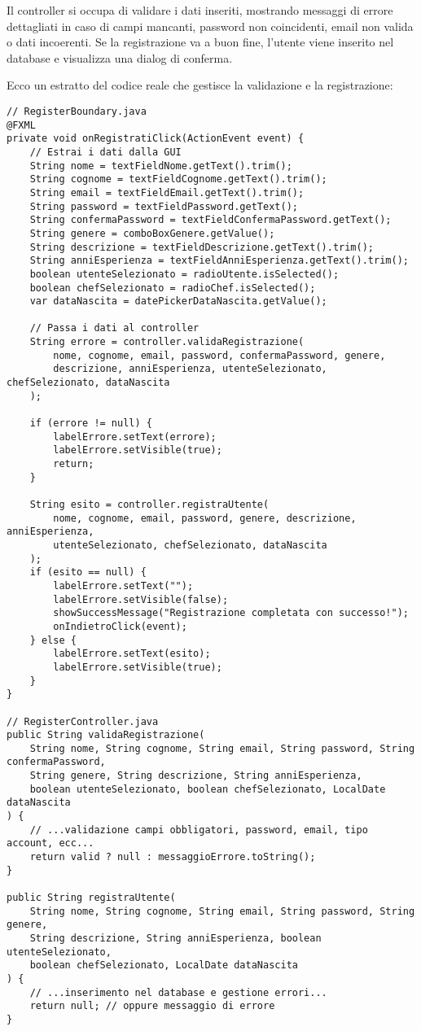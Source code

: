 Il controller si occupa di validare i dati inseriti, mostrando messaggi di errore dettagliati in caso di campi mancanti, password non coincidenti, email non valida o dati incoerenti. Se la registrazione va a buon fine, l’utente viene inserito nel database e visualizza una dialog di conferma.

Ecco un estratto del codice reale che gestisce la validazione e la registrazione:
\begin{verbatim}
// RegisterBoundary.java
@FXML
private void onRegistratiClick(ActionEvent event) {
    // Estrai i dati dalla GUI
    String nome = textFieldNome.getText().trim();
    String cognome = textFieldCognome.getText().trim();
    String email = textFieldEmail.getText().trim();
    String password = textFieldPassword.getText();
    String confermaPassword = textFieldConfermaPassword.getText();
    String genere = comboBoxGenere.getValue();
    String descrizione = textFieldDescrizione.getText().trim();
    String anniEsperienza = textFieldAnniEsperienza.getText().trim();
    boolean utenteSelezionato = radioUtente.isSelected();
    boolean chefSelezionato = radioChef.isSelected();
    var dataNascita = datePickerDataNascita.getValue();

    // Passa i dati al controller
    String errore = controller.validaRegistrazione(
        nome, cognome, email, password, confermaPassword, genere,
        descrizione, anniEsperienza, utenteSelezionato, chefSelezionato, dataNascita
    );

    if (errore != null) {
        labelErrore.setText(errore);
        labelErrore.setVisible(true);
        return;
    }

    String esito = controller.registraUtente(
        nome, cognome, email, password, genere, descrizione, anniEsperienza,
        utenteSelezionato, chefSelezionato, dataNascita
    );
    if (esito == null) {
        labelErrore.setText("");
        labelErrore.setVisible(false);
        showSuccessMessage("Registrazione completata con successo!");
        onIndietroClick(event);
    } else {
        labelErrore.setText(esito);
        labelErrore.setVisible(true);
    }
}

// RegisterController.java
public String validaRegistrazione(
    String nome, String cognome, String email, String password, String confermaPassword,
    String genere, String descrizione, String anniEsperienza,
    boolean utenteSelezionato, boolean chefSelezionato, LocalDate dataNascita
) {
    // ...validazione campi obbligatori, password, email, tipo account, ecc...
    return valid ? null : messaggioErrore.toString();
}

public String registraUtente(
    String nome, String cognome, String email, String password, String genere,
    String descrizione, String anniEsperienza, boolean utenteSelezionato,
    boolean chefSelezionato, LocalDate dataNascita
) {
    // ...inserimento nel database e gestione errori...
    return null; // oppure messaggio di errore
}
\end{verbatim}

